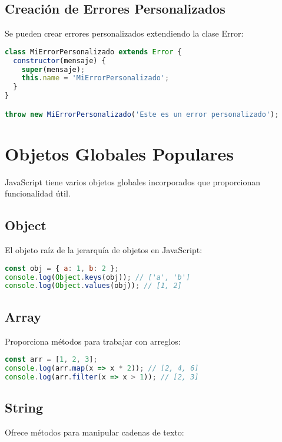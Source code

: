 \documentclass{book}
\begin{document}
\subsection{Creación de Errores Personalizados}

Se pueden crear errores personalizados extendiendo la clase Error:

\begin{lstlisting}[language=JavaScript]
class MiErrorPersonalizado extends Error {
  constructor(mensaje) {
    super(mensaje);
    this.name = 'MiErrorPersonalizado';
  }
}

throw new MiErrorPersonalizado('Este es un error personalizado');
\end{lstlisting}

\section{Objetos Globales Populares}

JavaScript tiene varios objetos globales incorporados que proporcionan funcionalidad útil.

\subsection{Object}

El objeto raíz de la jerarquía de objetos en JavaScript:

\begin{lstlisting}[language=JavaScript]
const obj = { a: 1, b: 2 };
console.log(Object.keys(obj)); // ['a', 'b']
console.log(Object.values(obj)); // [1, 2]
\end{lstlisting}

\subsection{Array}

Proporciona métodos para trabajar con arreglos:

\begin{lstlisting}[language=JavaScript]
const arr = [1, 2, 3];
console.log(arr.map(x => x * 2)); // [2, 4, 6]
console.log(arr.filter(x => x > 1)); // [2, 3]
\end{lstlisting}

\subsection{String}

Ofrece métodos para manipular cadenas de texto:
\end{document}

